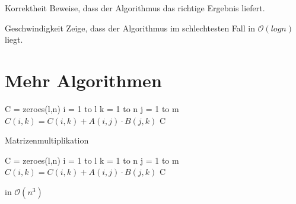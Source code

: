 \documentclass[18pt]{beamer}
\begin{document}
\begin{frame}{Korrektheit}
 Beweise, dass der Algorithmus das richtige Ergebnis liefert. \pause
\end{frame}

\begin{frame}{Geschwindigkeit}
 Zeige, dass der Algorithmus im schlechtesten Fall in $\mathcal O(log n)$ liegt.
\end{frame}

\section{Mehr Algorithmen}

\begin{frame}[fragile]
\begin{algorithmic}
  \State C = zeroes(l,n) 
  \For i = 1 to l
    \For k = 1 to n 
      \For j = 1 to m
        \State $C(i,k) = C(i,k) + A(i,j) \cdot B(j,k) $
      \EndFor 
    \EndFor
  \EndFor
  \State \Return C
\EndFunction
\end{algorithmic}
\end{frame}
\begin{frame}[fragile]{Matrizenmultiplikation}
\begin{algorithmic}
  \State C = zeroes(l,n) 
  \For i = 1 to l 
    \For k = 1 to n 
      \For j = 1 to m 
        \State $C(i,k) = C(i,k) + A(i,j) \cdot B(j,k) $
      \EndFor 
    \EndFor
  \EndFor
  \State \Return C
\EndFunction
\end{algorithmic}
in $\mathcal O(n^3)$
\end{frame}
\end{document}
